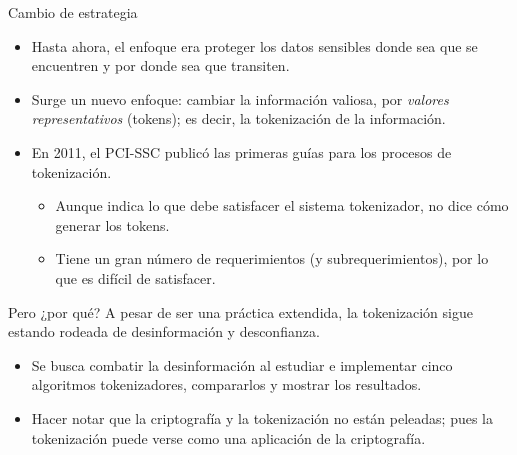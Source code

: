 \begin{frame}{Cambio de estrategia}
  \begin{itemize}
    \item Hasta ahora, el enfoque era proteger los datos sensibles donde sea
      que se encuentren y por donde sea que transiten.
    \item Surge un nuevo enfoque: cambiar la información valiosa, por
      \textit{valores representativos} (tokens); es decir, la tokenización
      de la información.
    \item En 2011, el PCI-SSC publicó las primeras guías para los procesos de
      tokenización.
      \begin{itemize}
        \item Aunque indica lo que debe satisfacer el sistema tokenizador,
          no dice cómo generar los tokens.
        \item Tiene un gran número de requerimientos (y subrequerimientos), por
          lo que es difícil de satisfacer.
      \end{itemize}
  \end{itemize}
\end{frame}

\begin{frame}{Pero ¿por qué?}
  A pesar de ser una práctica extendida, la tokenización sigue estando
  rodeada de desinformación y desconfianza.
  \begin{itemize}
    \item Se busca combatir la desinformación al estudiar e implementar cinco
      algoritmos tokenizadores, compararlos y mostrar los resultados.
    \item Hacer notar que la criptografía y la tokenización no están peleadas;
      pues la tokenización puede verse como una aplicación de la criptografía.
  \end{itemize}
\end{frame}
